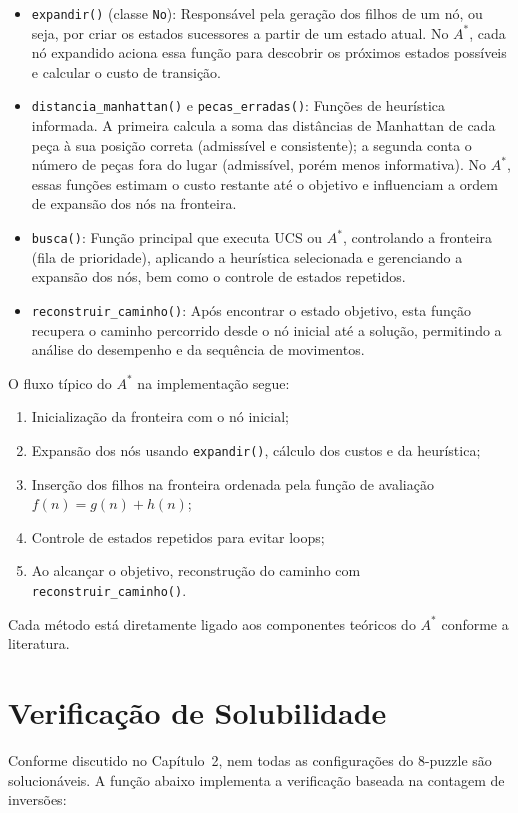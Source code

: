 \begin{itemize}  
    \item \texttt{expandir()} (classe \texttt{No}): Responsável pela geração dos filhos de um nó, ou seja, por criar os estados sucessores a partir de um estado atual. No $A^*$, cada nó expandido aciona essa função para descobrir os próximos estados possíveis e calcular o custo de transição.  
    \item \texttt{distancia\_manhattan()} e \texttt{pecas\_erradas()}: Funções de heurística informada. A primeira calcula a soma das distâncias de Manhattan de cada peça à sua posição correta (admissível e consistente); a segunda conta o número de peças fora do lugar (admissível, porém menos informativa). No $A^*$, essas funções estimam o custo restante até o objetivo e influenciam a ordem de expansão dos nós na fronteira.  
    \item \texttt{busca()}: Função principal que executa UCS ou $A^*$, controlando a fronteira (fila de prioridade), aplicando a heurística selecionada e gerenciando a expansão dos nós, bem como o controle de estados repetidos.  
    \item \texttt{reconstruir\_caminho()}: Após encontrar o estado objetivo, esta função recupera o caminho percorrido desde o nó inicial até a solução, permitindo a análise do desempenho e da sequência de movimentos.  
\end{itemize}  

O fluxo típico do $A^*$ na implementação segue:  
\begin{enumerate}  
    \item Inicialização da fronteira com o nó inicial;  
    \item Expansão dos nós usando \texttt{expandir()}, cálculo dos custos e da heurística;  
    \item Inserção dos filhos na fronteira ordenada pela função de avaliação $f(n) = g(n) + h(n)$;  
    \item Controle de estados repetidos para evitar loops;  
    \item Ao alcançar o objetivo, reconstrução do caminho com \texttt{reconstruir\_caminho()}.  
\end{enumerate}  
Cada método está diretamente ligado aos componentes teóricos do $A^*$ conforme a literatura.

\section{Verificação de Solubilidade}  
Conforme discutido no Capítulo~2, nem todas as configurações do 8-puzzle são solucionáveis. A função abaixo implementa a verificação baseada na contagem de inversões:  

